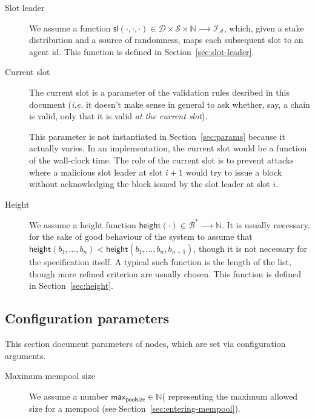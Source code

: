 \documentclass{article}
\newcommand{\lists}[1]{{#1}^*}
\newcommand{\idsof}[1]{\mathcal{I}\!_#1}
\newcommand{\blocks}{\mathcal{B}}
\newcommand{\agentids}{\idsof{\mathcal{A}}}
\newcommand{\slotleader}[3]{\mathsf{sl}(#1,#2,#3)}
\newcommand{\stakedistributions}{\mathcal{D}}
\newcommand{\seeds}{\mathcal{S}}
\newcommand{\height}[1]{\mathsf{height}(#1)}
\newcommand{\maxmempoolsize}{\mathsf{max}_{\mathsf{poolsize}}}
\begin{document}
\begin{description}
\item[Slot leader] We assume a function
  $\slotleader{⋅}{⋅}{⋅} ∈ \stakedistributions×\seeds×ℕ ⟶ \agentids$,
  which, given a stake distribution and a source of randomness, maps
  each subsequent slot to an agent id. This function is defined in
  Section~\ref{sec:slot-leader}.

\item[Current slot] The current slot is a parameter of the validation
  rules desribed in this document (\emph{i.e.} it doesn't make sense
  in general to ask whether, say, a chain is valid, only that it is
  valid \emph{at the current slot}).

  This parameter is not instantiated in Section~\ref{sec:params}
  because it actually varies. In an implementation, the current slot
  would be a function of the wall-clock time. The role of the current
  slot is to prevent attacks where a malicious slot leader at slot
  $i+1$ would try to issue a block without acknowledging the block
  issued by the slot leader at slot $i$.

\item[Height] We assume a height function
  $\height{⋅} ∈ \lists{\blocks} ⟶ ℕ$. It is usually necessary, for the
  sake of good behaviour of the system to assume that
  $\height{b₁,…,b_n} < \height{b₁,…,b_n,b_{n+1}}$, though it is not
  necessary for the specification itself. A typical such function is
  the length of the list, though more refined criterion are usually
  chosen. This function is defined in Section~\ref{sec:height}.

\end{description}

\subsection{Configuration parameters}
\label{sec:conf-param}

This section document parameters of nodes, which are set via
configuration arguments.

\begin{description}
\item[Maximum mempool size] We assume a number $\maxmempoolsize ∈ ℕ$(
  representing the maximum allowed size for a mempool (see
  Section~\ref{sec:entering-mempool}).
\end{description}
\end{document}
